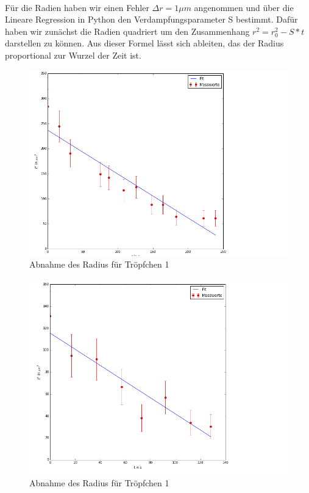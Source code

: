 \documentclass[10pt,a4paper]{article}
\begin{document}
\\Für die Radien haben wir einen Fehler $\Delta r = 1\mu m$ angenommen und über die Lineare Regression in Python den Verdampfungsparameter S bestimmt. Dafür haben wir zunächst die Radien quadriert um den Zusammenhang $r^{2} = r_{0}^{2} - S*t$ darstellen zu können. Aus dieser Formel lässt sich ableiten, das der Radius proportional zur Wurzel der Zeit ist.
\begin{figure}[h]
	\includegraphics[scale = 0.5]{Graph1.png}
	\centering
	\caption{Abnahme des Radius für Tröpfchen 1}
	\label{optical_cavities}
\end{figure}
\begin{figure}[h]
	\includegraphics[scale = 0.5]{Graph2.png}
	\centering
	\caption{Abnahme des Radius für Tröpfchen 1}
	\label{optical_cavities}
\end{figure}
\end{document}
